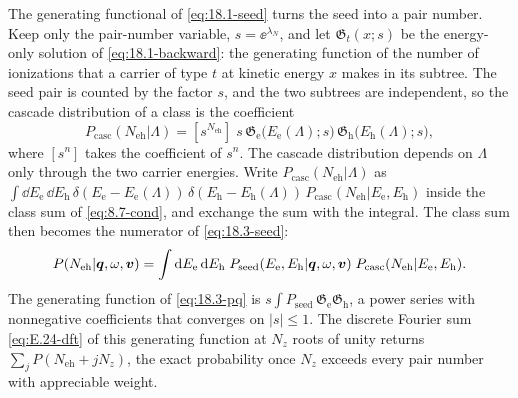 The generating functional of \cref{eq:18.1-seed} turns the seed into a pair number. Keep only the pair-number variable, $s = \ee^{\lambda_N}$, and let $\mathfrak{G}_t(x;s)$ be the energy-only solution of \cref{eq:18.1-backward}: the generating function of the number of ionizations that a carrier of type $t$ at kinetic energy $x$ makes in its subtree. The seed pair is counted by the factor $s$, and the two subtrees are independent, so the cascade distribution of a class is the coefficient
\begin{equation}
  P_{\mathrm{casc}}(N_{\mathrm{eh}}|\Lambda) = [s^{N_{\mathrm{eh}}}]\;s\,\mathfrak{G}_{\mathrm{e}}\bigl(E_{\mathrm{e}}(\Lambda);s\bigr)\,\mathfrak{G}_{\mathrm{h}}\bigl(E_{\mathrm{h}}(\Lambda);s\bigr) ,
  \label{eq:18.3-pcasc}
\end{equation}
where $[s^n]$ takes the coefficient of $s^n$. The cascade distribution depends on $\Lambda$ only through the two carrier energies. Write $P_{\mathrm{casc}}(N_{\mathrm{eh}}|\Lambda)$ as $\int\dd E_{\mathrm{e}}\,\dd E_{\mathrm{h}}\,\delta(E_{\mathrm{e}} - E_{\mathrm{e}}(\Lambda))\,\delta(E_{\mathrm{h}} - E_{\mathrm{h}}(\Lambda))\,P_{\mathrm{casc}}(N_{\mathrm{eh}}|E_{\mathrm{e}},E_{\mathrm{h}})$ inside the class sum of \cref{eq:8.7-cond}, and exchange the sum with the integral. The class sum then becomes the numerator of \cref{eq:18.3-seed}:
\begin{equation}
  P(N_{\mathrm{eh}}|\bm{q},\omega,\bm{v}) = \int\mathrm{d} E_{\mathrm{e}}\,\mathrm{d} E_{\mathrm{h}}\;P_{\mathrm{seed}}(E_{\mathrm{e}},E_{\mathrm{h}}|\bm{q},\omega,\bm{v})\;P_{\mathrm{casc}}(N_{\mathrm{eh}}|E_{\mathrm{e}},E_{\mathrm{h}}) .
  \label{eq:18.3-pq}
\end{equation}
The generating function of \cref{eq:18.3-pq} is $s\int P_{\mathrm{seed}}\,\mathfrak{G}_{\mathrm{e}}\mathfrak{G}_{\mathrm{h}}$, a power series with nonnegative coefficients that converges on $|s| \le 1$. The discrete Fourier sum \cref{eq:E.24-dft} of this generating function at $N_z$ roots of unity returns $\sum_jP(N_{\mathrm{eh}} + jN_z)$, the exact probability once $N_z$ exceeds every pair number with appreciable weight.

